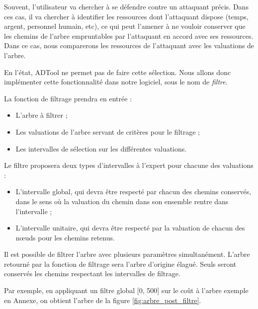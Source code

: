 		Souvent, l'utilisateur va chercher à se défendre contre un attaquant précis. Dans ces cas, il va chercher à identifier les ressources dont l'attaquant dispose (temps, argent, personnel humain, etc), ce qui peut l'amener à ne vouloir conserver que les chemins de l'arbre empruntables par l'attaquant en accord avec ses ressources. Dans ce cas, nous comparerons les ressources de l'attaquant avec les valuations de l'arbre.

		En l'état, ADTool ne permet pas de faire cette sélection. Nous allons donc implémenter cette fonctionnalité dans notre logiciel, sous le nom de \textit{filtre}. %

		La fonction de filtrage prendra en entrée : 
		\begin{itemize}
			\item L'arbre à filtrer ;
			\item Les valuations de l'arbre servant de critères pour le filtrage ;
			\item Les intervalles de sélection sur les différentes valuations.
		\end{itemize} %

		Le filtre proposera deux types d'intervalles à l'expert pour chacune des valuations :
		\begin{itemize}
			\item L'intervalle global, qui devra être respecté par chacun des chemins conservés, dans le sens où la valuation du chemin dans son ensemble rentre dans l'intervalle ;
			\item L'intervalle unitaire, qui devra être respecté par la valuation de chacun des nœuds pour les chemins retenus.
		\end{itemize} %

		Il est possible de filtrer l'arbre avec plusieurs paramètres simultanément.
		L'arbre retourné par la fonction de filtrage sera l'arbre d'origine élagué. Seuls seront conservés les chemins respectant les intervalles de filtrage.
		
		Par exemple, en appliquant un filtre global [0, 500] sur le coût à l'arbre exemple en Annexe, on obtient l'arbre de la figure \ref{fig:arbre_post_filtre}.

